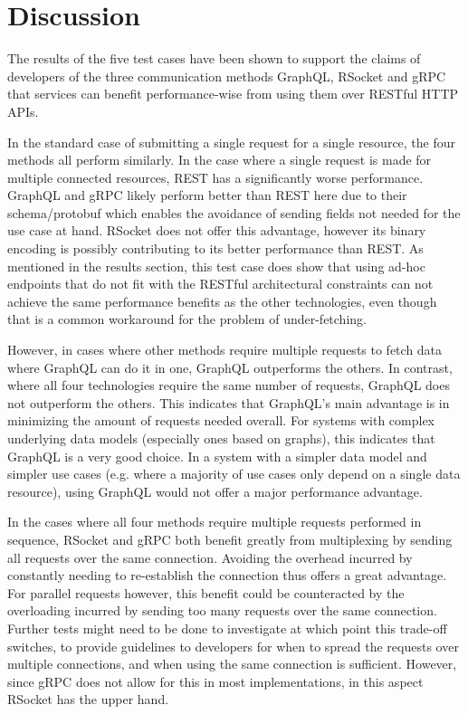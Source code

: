 \chapter{Discussion}
The results of the five test cases have been shown to support the claims of developers of the three communication methods GraphQL, RSocket and gRPC that services can benefit performance-wise from using them over RESTful HTTP APIs. 

In the standard case of submitting a single request for a single resource, the four methods all perform similarly. In the case where a single request is made for multiple connected resources, REST has a significantly worse performance. GraphQL and gRPC likely perform better than REST here due to their schema/protobuf which enables the avoidance of sending fields not needed for the use case at hand. RSocket does not offer this advantage, however its binary encoding is possibly contributing to its better performance than REST. As mentioned in the results section, this test case does show that using ad-hoc endpoints that do not fit with the RESTful architectural constraints can not achieve the same performance benefits as the other technologies, even though that is a common workaround for the problem of under-fetching.

However, in cases where other methods require multiple requests to fetch data where GraphQL can do it in one, GraphQL outperforms the others. In contrast, where all four technologies require the same number of requests, GraphQL does not outperform the others. This indicates that GraphQL's main advantage is in minimizing the amount of requests needed overall. For systems with complex underlying data models (especially ones based on graphs), this indicates that GraphQL is a very good choice. In a system with a simpler data model and simpler use cases (e.g. where a majority of use cases only depend on a single data resource), using GraphQL would not offer a major performance advantage.

In the cases where all four methods require multiple requests performed in sequence, RSocket and gRPC both benefit greatly from multiplexing by sending all requests over the same connection. Avoiding the overhead incurred by constantly needing to re-establish the connection thus offers a great advantage. For parallel requests however, this benefit could be counteracted by the overloading incurred by sending too many requests over the same connection. Further tests might need to be done to investigate at which point this trade-off switches, to provide guidelines to developers for when to spread the requests over multiple connections, and when using the same connection is sufficient. However, since gRPC does not allow for this in most implementations, in this aspect RSocket has the upper hand.


